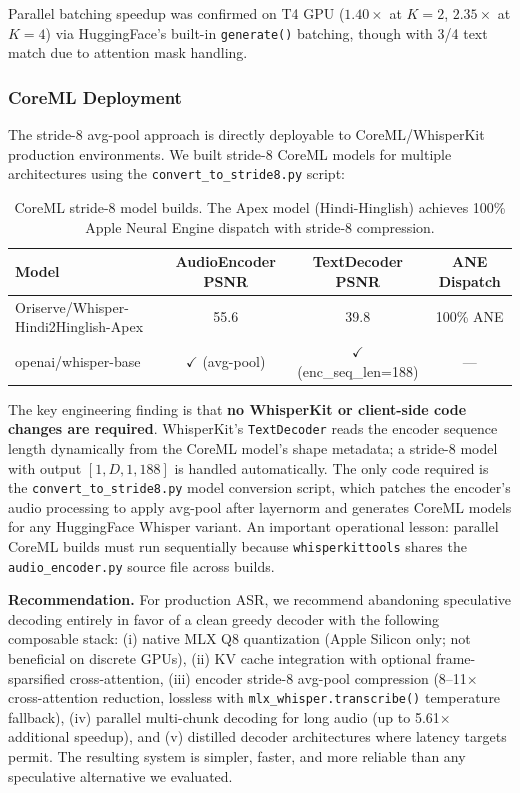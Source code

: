 \documentclass[11pt,a4paper]{article}
\begin{document}
Parallel batching speedup was confirmed on T4 GPU ($1.40\times$ at $K=2$, $2.35\times$ at $K=4$) via HuggingFace's built-in \texttt{generate()} batching, though with 3/4 text match due to attention mask handling.

\subsubsection{CoreML Deployment}
\label{sec:coreml}

The stride-8 avg-pool approach is directly deployable to CoreML/WhisperKit production environments. We built stride-8 CoreML models for multiple architectures using the \texttt{convert\_to\_stride8.py} script:

\begin{table}[H]
\centering
\small
\begin{tabular}{@{}lccc@{}}
\toprule
\textbf{Model} & \textbf{AudioEncoder PSNR} & \textbf{TextDecoder PSNR} & \textbf{ANE Dispatch} \\
\midrule
Oriserve/Whisper-Hindi2Hinglish-Apex & 55.6 & 39.8 & 100\% ANE \\
openai/whisper-base & $\checkmark$ (avg-pool) & $\checkmark$ (enc\_seq\_len=188) & --- \\
\bottomrule
\end{tabular}
\caption{CoreML stride-8 model builds. The Apex model (Hindi-Hinglish) achieves 100\% Apple Neural Engine dispatch with stride-8 compression.}
\label{tab:coreml}
\end{table}

The key engineering finding is that \textbf{no WhisperKit or client-side code changes are required}. WhisperKit's \texttt{TextDecoder} reads the encoder sequence length dynamically from the CoreML model's shape metadata; a stride-8 model with output $[1, D, 1, 188]$ is handled automatically. The only code required is the \texttt{convert\_to\_stride8.py} model conversion script, which patches the encoder's audio processing to apply avg-pool after layernorm and generates CoreML models for any HuggingFace Whisper variant. An important operational lesson: parallel CoreML builds must run sequentially because \texttt{whisperkittools} shares the \texttt{audio\_encoder.py} source file across builds.

\noindent\textbf{Recommendation.} For production ASR, we recommend abandoning speculative decoding entirely in favor of a clean greedy decoder with the following composable stack: (i) native MLX Q8 quantization (Apple Silicon only; not beneficial on discrete GPUs), (ii) KV cache integration with optional frame-sparsified cross-attention, (iii) encoder stride-8 avg-pool compression (8--11$\times$ cross-attention reduction, lossless with \texttt{mlx\_whisper.transcribe()} temperature fallback), (iv) parallel multi-chunk decoding for long audio (up to 5.61$\times$ additional speedup), and (v) distilled decoder architectures where latency targets permit. The resulting system is simpler, faster, and more reliable than any speculative alternative we evaluated.
\end{document}
